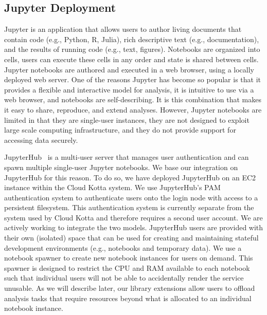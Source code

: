 \subsection{Jupyter Deployment}

Jupyter is an application that allows users to author living documents
that contain code (e.g., Python, R, Julia), rich descriptive text (e.g., documentation), 
and the results of running code (e.g., text, figures). Notebooks are organized into cells,
users can execute these cells in any order and state is shared between cells. 
Jupyter notebooks are authored and executed in a web browser, using a locally
deployed web server. 
One of the reasons Jupyter has become so popular is that it provides 
a flexible and interactive model for analysis, it is intuitive to use
via a web browser, and notebooks are self-describing. It is this combination
that makes it easy to share, reproduce, and extend analyses.
However, Jupyter notebooks are limited in that they are single-user
instances, they are not designed to exploit large scale computing
infrastructure, and they do not provide support for accessing 
data securely. 

JupyterHub~\cite{jupyterhub} is a multi-user server that manages user authentication and 
can spawn multiple single-user Jupyter notebooks. We base our integration
on JupyterHub for this reason. To do so, we have deployed JupyterHub
on an EC2 instance within the Cloud Kotta system. We use JupyterHub's PAM
authentication system to authenticate users onto the login node with access
to a persistent filesystem. This authentication system is currently separate
from the system used by Cloud Kotta and therefore requires a second user
account.  We are actively working to integrate the two models. 
JupyterHub users are provided with their own (isolated) space that
can be used for creating and maintaining stateful development environments
(e.g., notebooks and temporary data). We use a notebook spawner
to create new notebook instances for users on demand. This spawner is designed
to restrict the CPU and RAM available to each notebook such that
individual users will not be able to accidentally render the service unusable.
As we will describe later, our library extensions allow users to offload analysis
tasks that require resources beyond what is allocated to an individual notebook instance. 


